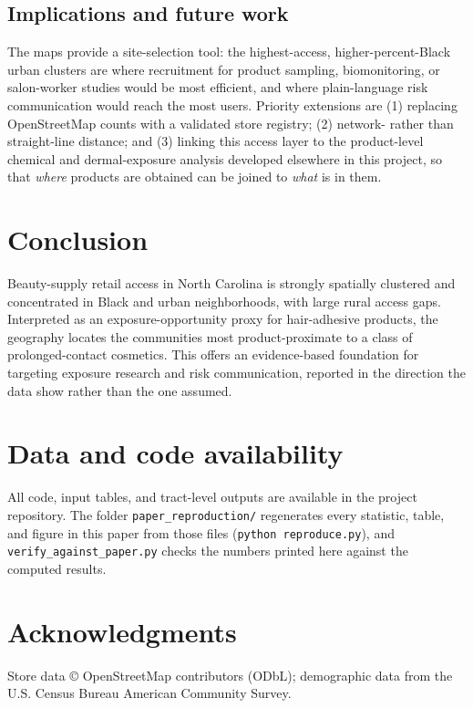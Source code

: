 \documentclass[12pt,letterpaper]{article}
\begin{document}
\subsection{Implications and future work}

The maps provide a site-selection tool: the highest-access, higher-percent-Black
urban clusters are where recruitment for product sampling, biomonitoring, or
salon-worker studies would be most efficient, and where plain-language risk
communication would reach the most users. Priority extensions are (1) replacing
OpenStreetMap counts with a validated store registry; (2) network- rather than
straight-line distance; and (3) linking this access layer to the product-level
chemical and dermal-exposure analysis developed elsewhere in this project, so
that \emph{where} products are obtained can be joined to \emph{what} is in them.

\section{Conclusion}
\label{sec:conclusion}

Beauty-supply retail access in North Carolina is strongly spatially clustered and
concentrated in Black and urban neighborhoods, with large rural access gaps.
Interpreted as an exposure-opportunity proxy for hair-adhesive products, the
geography locates the communities most product-proximate to a class of
prolonged-contact cosmetics. This offers an evidence-based foundation for targeting
exposure research and risk communication, reported in the direction the data show
rather than the one assumed.

\section*{Data and code availability}
All code, input tables, and tract-level outputs are available in the project
repository. The folder \texttt{paper\_reproduction/} regenerates every statistic,
table, and figure in this paper from those files (\texttt{python reproduce.py}), and
\texttt{verify\_against\_paper.py} checks the numbers printed here against the
computed results.

\section*{Acknowledgments}
Store data \copyright{}
OpenStreetMap contributors (ODbL); demographic data from the U.S. Census Bureau
American Community Survey.
\end{document}
